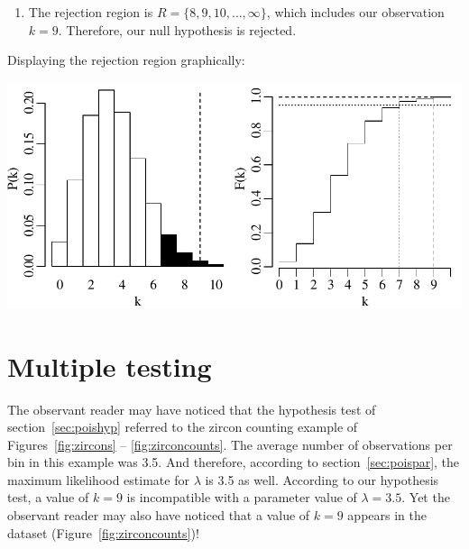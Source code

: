 \begin{enumerate}
\item\label{it:poisl351sided} The rejection region is $R =
  \{8,9,10,\ldots,\infty\}$, which includes our observation
  $k=9$. Therefore, our null hypothesis is rejected.

\end{enumerate}

Displaying the rejection region graphically:

\noindent\begin{minipage}[t][][b]{.6\textwidth}
  \includegraphics[width=\textwidth]{../figures/poishyp.pdf}\\
\end{minipage}
\begin{minipage}[t][][t]{.4\textwidth}
  \label{fig:poishyp}
\end{minipage}

\section{Multiple testing}
\label{sec:multipletesting}

The observant reader may have noticed that the hypothesis test of
section~\ref{sec:poishyp} referred to the zircon counting example of
Figures~\ref{fig:zircons} -- \ref{fig:zirconcounts}. The average
number of observations per bin in this example was 3.5. And therefore,
according to section~\ref{sec:poispar}, the maximum likelihood
estimate for $\lambda$ is 3.5 as well. According to our hypothesis
test, a value of $k=9$ is incompatible with a parameter value of
$\lambda=3.5$. Yet the observant reader may also have noticed that a
value of $k=9$ appears in the dataset
(Figure~\ref{fig:zirconcounts})!\\

